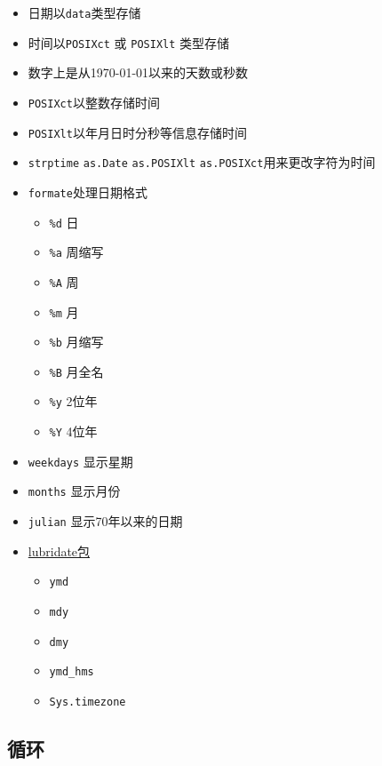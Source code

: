 \documentclass[]{book}
\providecommand{\tightlist}{%
  \setlength{\itemsep}{0pt}\setlength{\parskip}{0pt}}
\begin{document}
\begin{itemize}
\tightlist
\item
  日期以\texttt{data}类型存储
\item
  时间以\texttt{POSIXct} 或 \texttt{POSIXlt} 类型存储
\item
  数字上是从1970-01-01以来的天数或秒数
\item
  \texttt{POSIXct}以整数存储时间
\item
  \texttt{POSIXlt}以年月日时分秒等信息存储时间
\item
  \texttt{strptime} \texttt{as.Date} \texttt{as.POSIXlt} \texttt{as.POSIXct}用来更改字符为时间
\item
  \texttt{formate}处理日期格式

  \begin{itemize}
  \tightlist
  \item
    \texttt{\%d} 日
  \item
    \texttt{\%a} 周缩写
  \item
    \texttt{\%A} 周
  \item
    \texttt{\%m} 月
  \item
    \texttt{\%b} 月缩写
  \item
    \texttt{\%B} 月全名
  \item
    \texttt{\%y} 2位年
  \item
    \texttt{\%Y} 4位年
  \end{itemize}
\item
  \texttt{weekdays} 显示星期
\item
  \texttt{months} 显示月份
\item
  \texttt{julian} 显示70年以来的日期
\item
  \href{http://cran.r-project.org/web/packages/lubridate/vignettes/lubridate.html}{lubridate包}

  \begin{itemize}
  \tightlist
  \item
    \texttt{ymd}
  \item
    \texttt{mdy}
  \item
    \texttt{dmy}
  \item
    \texttt{ymd\_hms}
  \item
    \texttt{Sys.timezone}
  \end{itemize}
\end{itemize}

\hypertarget{ux5faaux73af}{%
\subsection{循环}\label{ux5faaux73af}}
\end{document}

